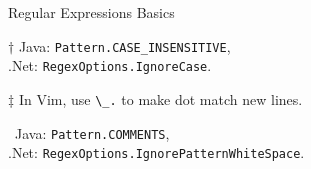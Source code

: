\documentclass[11pt, a4paper, landscape]{scrartcl}
\newcommand{\regex}[1]{\texttt{#1}}
\newcommand{\code}[1]{\texttt{#1}}
\newcommand{\bs}{\textbackslash}
\newcommand{\dnet}{{.}Net}
\begin{document}
\begin{cheatsheet}{Regular Expressions Basics}
\begin{col3}

\begin{cheatnote}
$\dagger$ Java: \code{Pattern.CASE\_INSENSITIVE},\\
\dnet: \code{RegexOptions.IgnoreCase}.
\end{cheatnote}
$\ddagger$ In Vim, use \regex{\bs\_.} to make dot match new lines.\\
\begin{cheatnote}
\textsection\ Java: \code{Pattern.COMMENTS},\\
\dnet: \code{RegexOptions.IgnorePatternWhiteSpace}.
\end{cheatnote}

\end{col3}
\end{cheatsheet}

\newpage
\end{document}
